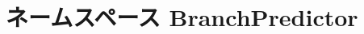 \hypertarget{namespaceBranchPredictor}{
\section{ネームスペース BranchPredictor}
\label{namespaceBranchPredictor}
}
